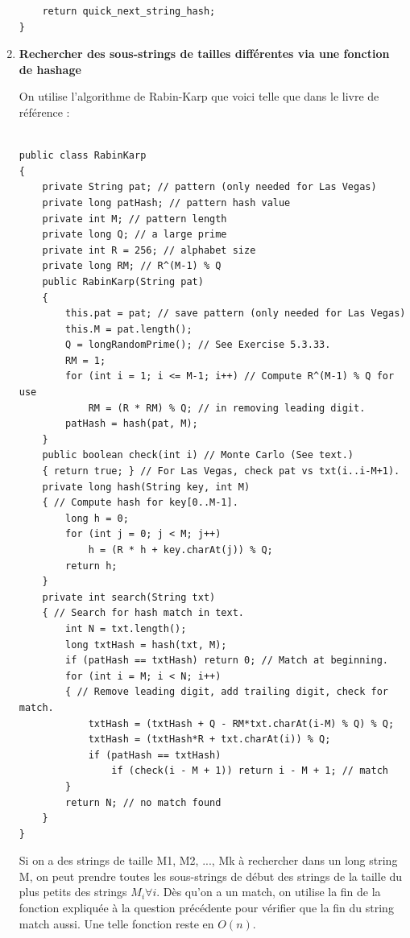 \documentclass[11pt]{article}
\begin{document}
\begin{enumerate}
\begin{lstlisting}
	return quick_next_string_hash;
}

\end{lstlisting}

\item \textbf{Rechercher des sous-strings de tailles différentes via une fonction de hashage}

On utilise l'algorithme de Rabin-Karp que voici telle que dans le livre de référence :

\begin{lstlisting}

public class RabinKarp
{
	private String pat; // pattern (only needed for Las Vegas)
	private long patHash; // pattern hash value
	private int M; // pattern length
	private long Q; // a large prime
	private int R = 256; // alphabet size
	private long RM; // R^(M-1) % Q
	public RabinKarp(String pat)
	{
		this.pat = pat; // save pattern (only needed for Las Vegas)
		this.M = pat.length();
		Q = longRandomPrime(); // See Exercise 5.3.33.
		RM = 1;
		for (int i = 1; i <= M-1; i++) // Compute R^(M-1) % Q for use
			RM = (R * RM) % Q; // in removing leading digit.
		patHash = hash(pat, M);
	}
	public boolean check(int i) // Monte Carlo (See text.)
	{ return true; } // For Las Vegas, check pat vs txt(i..i-M+1).
	private long hash(String key, int M)
	{ // Compute hash for key[0..M-1].
		long h = 0;
		for (int j = 0; j < M; j++)
			h = (R * h + key.charAt(j)) % Q;
		return h;
	}
	private int search(String txt)
	{ // Search for hash match in text.
		int N = txt.length();
		long txtHash = hash(txt, M);
		if (patHash == txtHash) return 0; // Match at beginning.
		for (int i = M; i < N; i++)
		{ // Remove leading digit, add trailing digit, check for match.
			txtHash = (txtHash + Q - RM*txt.charAt(i-M) % Q) % Q;
			txtHash = (txtHash*R + txt.charAt(i)) % Q;
			if (patHash == txtHash)
				if (check(i - M + 1)) return i - M + 1; // match
		}
		return N; // no match found
	}
}

\end{lstlisting}

Si on a des strings de taille M1, M2, ..., Mk à rechercher dans un long string M,
on peut prendre toutes les sous-strings de début des strings de la taille du plus 
petits des strings $ M_{i} \forall i $.
Dès qu'on a un match, on utilise la fin de la fonction expliquée à la question précédente
pour vérifier que la fin du string match aussi. Une telle fonction reste en $ O(n) $.


\end{enumerate}
\end{document}
